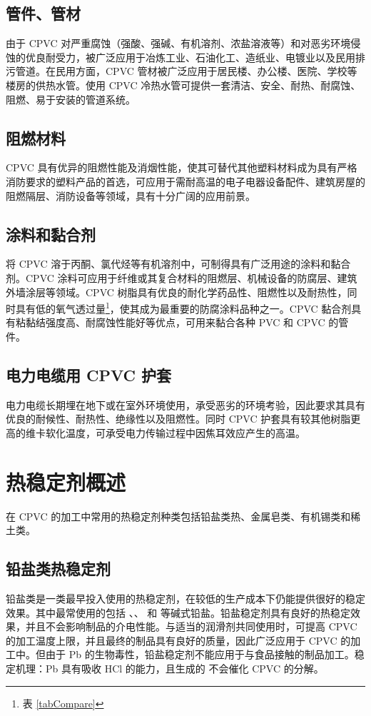 \subsection{管件、管材}
由于 CPVC 对严重腐蚀（强酸、强碱、有机溶剂、浓盐溶液等）和对恶劣环境侵蚀的优良耐受力，被广泛应用于冶炼工业、石油化工、造纸业、电镀业以及民用排污管道。在民用方面，CPVC 管材被广泛应用于居民楼、办公楼、医院、学校等楼房的供热水管。使用 CPVC 冷热水管可提供一套清洁、安全、耐热、耐腐蚀、阻燃、易于安装的管道系统。

\subsection{阻燃材料}
CPVC 具有优异的阻燃性能及消烟性能，使其可替代其他塑料材料成为具有严格消防要求的塑料产品的首选，可应用于需耐高温的电子电器设备配件、建筑房屋的阻燃隔层、消防设备等领域，具有十分广阔的应用前景。

\subsection{涂料和黏合剂}
将 CPVC 溶于丙酮、氯代烃等有机溶剂中，可制得具有广泛用途的涂料和黏合剂。CPVC 涂料可应用于纤维或其复合材料的阻燃层、机械设备的防腐层、建筑外墙涂层等领域。CPVC 树脂具有优良的耐化学药品性、阻燃性以及耐热性，同时具有低的氧气透过量\footnote{表 \ref{tabCompare}}，使其成为最重要的防腐涂料品种之一。CPVC 黏合剂具有粘黏结强度高、耐腐蚀性能好等优点，可用来黏合各种 PVC 和 CPVC 的管件。

\subsection{电力电缆用 CPVC 护套}
电力电缆长期埋在地下或在室外环境使用，承受恶劣的环境考验，因此要求其具有优良的耐候性、耐热性、绝缘性以及阻燃性。同时 CPVC 护套具有较其他树脂更高的维卡软化温度，可承受电力传输过程中因焦耳效应产生的高温。

\section{热稳定剂概述}

在 CPVC 的加工中常用的热稳定剂种类包括铅盐类热、金属皂类、有机锡类和稀土类。

\subsection{铅盐类热稳定剂}
铅盐类是一类最早投入使用的热稳定剂，在较低的生产成本下仍能提供很好的稳定效果。其中最常使用的包括 、、 和  等碱式铅盐。铅盐稳定剂具有良好的热稳定效果，并且不会影响制品的介电性能。与适当的润滑剂共同使用时，可提高 CPVC 的加工温度上限，并且最终的制品具有良好的质量，因此广泛应用于 CPVC 的加工中。但由于 Pb 的生物毒性，铅盐稳定剂不能应用于与食品接触的制品加工。稳定机理：Pb 具有吸收 HCl 的能力，且生成的  不会催化 CPVC 的分解。

